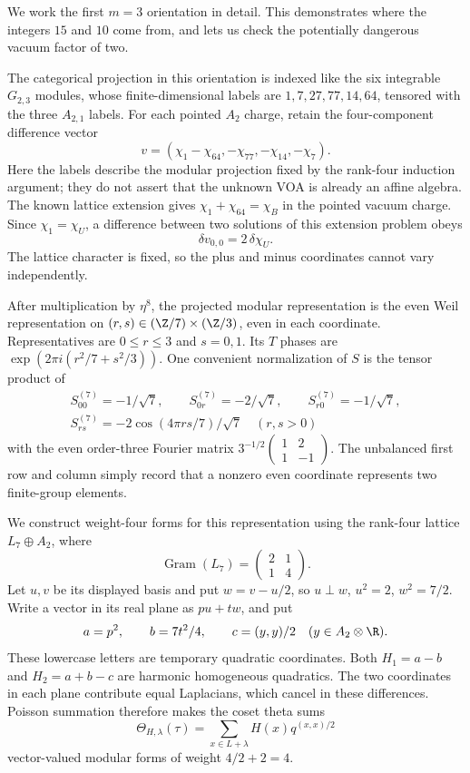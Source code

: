 We work the first $m=3$ orientation in detail. This demonstrates
where the integers $15$ and $10$ come from, and lets us check
the potentially dangerous vacuum factor of two.

The categorical projection in this orientation is indexed like the
six integrable $G_{2,3}$ modules, whose finite-dimensional labels
are $1,7,27,77,14,64$, tensored with the three $A_{2,1}$
labels. For each pointed $A_2$ charge, retain the four-component
difference vector
\[
 v=(\chi_1-\chi_{64},-\chi_{77},-\chi_{14},-\chi_7).
\]
Here the labels describe the modular projection fixed by the
rank-four induction argument; they do not assert that the unknown
VOA is already an affine algebra. The known lattice extension
gives $\chi_1+\chi_{64}=\chi_B$ in the pointed vacuum charge.
Since $\chi_1=\chi_U$, a difference between two solutions of
this extension problem obeys
\[
 \delta v_{0,0}=2\,\delta\chi_U.
\]
The lattice character is fixed, so the plus and minus coordinates
cannot vary independently.

After multiplication by $\eta^8$, the projected modular
representation is the even Weil representation on
$(r,s)\in(\Z/7)\times(\Z/3)$, even in each coordinate.
Representatives are $0\leq r\leq3$ and $s=0,1$. Its $T$
phases are $\exp(2\pi i(r^2/7+s^2/3))$. One convenient
normalization of $S$ is the tensor product of
\[
\begin{gathered}
 S^{(7)}_{00}=-1/\sqrt7,\qquad
 S^{(7)}_{0r}=-2/\sqrt7,\qquad
 S^{(7)}_{r0}=-1/\sqrt7,\\
 S^{(7)}_{rs}=-2\cos(4\pi rs/7)/\sqrt7
 \quad(r,s>0)
\end{gathered}
\]
with the even order-three Fourier matrix
$3^{-1/2}\left(\begin{smallmatrix}1&2\\1&-1\end{smallmatrix}\right)$.
The unbalanced first row and column simply record that a nonzero
even coordinate represents two finite-group elements.

We construct weight-four forms for this representation using the
rank-four lattice $L_7\oplus A_2$, where
\[
 \operatorname{Gram}(L_7)=
 \begin{pmatrix}2&1\\1&4\end{pmatrix}.
\]
Let $u,v$ be its displayed basis and put $w=v-u/2$, so
$u\perp w$, $u^2=2$, $w^2=7/2$. Write a vector in its
real plane as $pu+tw$, and put
\[
 a=p^2,\qquad b=7t^2/4,\qquad c=(y,y)/2
 \quad(y\in A_2\otimes\R).
\]
These lowercase letters are temporary quadratic coordinates.
Both $H_1=a-b$ and $H_2=a+b-c$ are harmonic homogeneous
quadratics. The two coordinates in each plane contribute equal
Laplacians, which cancel in these differences. Poisson summation
therefore makes the coset theta sums
\[
 \Theta_{H,\lambda}(\tau)
    =\sum_{x\in L+\lambda}H(x)q^{(x,x)/2}
\]
vector-valued modular forms of weight $4/2+2=4$.

